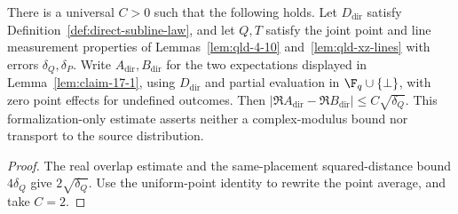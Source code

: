 \begin{lemma}
	\label{lem:claim-17-1-re-direct}
	\leanok
	There is a universal $C>0$ such that the following holds.
	Let $D_{\mathrm{dir}}$ satisfy Definition~\ref{def:direct-subline-law},
	and let $Q,T$ satisfy the joint point and line measurement properties of
	Lemmas~\ref{lem:qld-4-10} and~\ref{lem:qld-xz-lines} with errors
	$\delta_Q,\delta_P$. Write
	$A_{\mathrm{dir}},B_{\mathrm{dir}}$ for the two expectations displayed in
	Lemma~\ref{lem:claim-17-1}, using $D_{\mathrm{dir}}$ and partial
	evaluation in $\F_q \cup \{\bot\}$, with zero point effects for undefined
	outcomes. Then
	$|\Re A_{\mathrm{dir}}-\Re B_{\mathrm{dir}}|\le C\sqrt{\delta_Q}$.
	This formalization-only estimate asserts neither a complex-modulus bound
	nor transport to the source distribution.
\end{lemma}
\begin{proof}
	\leanok
	The real overlap estimate and the same-placement squared-distance bound
	$4\delta_Q$ give $2\sqrt{\delta_Q}$. Use the uniform-point identity to
	rewrite the point average, and take $C=2$.
\end{proof}

